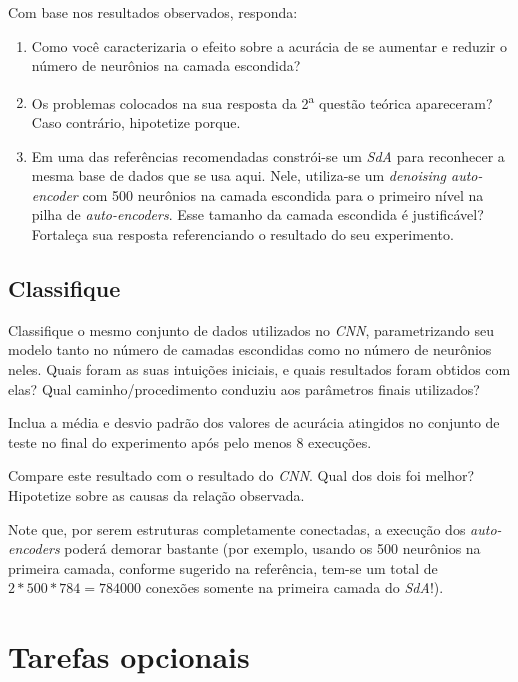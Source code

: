 \documentclass[12pt, a4paper]{article}
\begin{document}
Com base nos resultados observados, responda:
\begin{enumerate}
\item Como você caracterizaria o efeito sobre a acurácia de se aumentar e reduzir o número de neurônios na camada escondida?
\item Os problemas colocados na sua resposta da 2\textsuperscript{a} questão teórica apareceram? Caso contrário, hipotetize porque.
\item Em uma das referências recomendadas constrói-se um \emph{SdA} para reconhecer a mesma base de dados que se usa aqui. Nele, utiliza-se um \emph{denoising auto-encoder} com 500 neurônios na camada escondida para o primeiro nível na pilha de \emph{auto-encoders}. Esse tamanho da camada escondida é justificável? Fortaleça sua resposta referenciando o resultado do seu experimento.
\end{enumerate}


\subsection{Classifique}

Classifique o mesmo conjunto de dados utilizados no \emph{CNN}, parametrizando seu modelo tanto no número de camadas escondidas como no número de neurônios neles. Quais foram as suas intuições iniciais, e quais resultados foram obtidos com elas? Qual caminho/procedimento conduziu aos parâmetros finais utilizados?

Inclua a média e desvio padrão dos valores de acurácia atingidos no conjunto de teste no final do experimento após pelo menos 8 execuções.

Compare este resultado com o resultado do \emph{CNN}. Qual dos dois foi melhor? Hipotetize sobre as causas da relação observada. 

Note que, por serem estruturas completamente conectadas, a execução dos \emph{auto-encoders} poderá demorar bastante (por exemplo, usando os 500 neurônios na primeira camada, conforme sugerido na referência, tem-se um total de $2*500*784 = 784000$ conexões somente na primeira camada do \emph{SdA}!).

\section{Tarefas opcionais}
\end{document}
